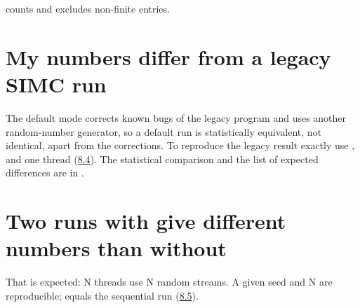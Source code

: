 counts and excludes non-finite entries.

\section*{\texorpdfstring{My numbers differ from a legacy SIMC run}{My numbers differ from a legacy SIMC run}}\label{user_manual-10u5ffaq:my-numbers-differ-from-a-legacy-simc-run}
The default mode corrects known bugs of the legacy program and uses another random-number generator, so a default run is
statistically equivalent, not identical, apart from the corrections. To reproduce the legacy result exactly use ,
 and one thread (\hyperref[user_manual-08u5frunningu5fandu5freproducibility:84-reproducing-legacy-simc-results-exactly]{8.4}).
The statistical comparison and the list of expected differences are in .

\section*{\texorpdfstring{Two runs with  give different numbers than without}{Two runs with -{}-threads give different numbers than without}}\label{user_manual-10u5ffaq:two-runs-with---threads-give-different-numbers-than-without}
That is expected: N threads use N random streams. A given seed and N are reproducible;  equals the
sequential run (\hyperref[user_manual-08u5frunningu5fandu5freproducibility:85-threads---threads-n]{8.5}).


